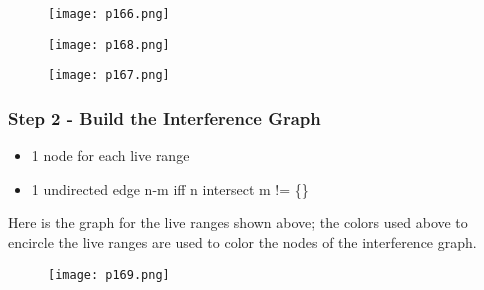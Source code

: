 \begin{figure}[H]
	\centering
	\texttt{[image: p166.png]}
	\caption{}
	\label{fig:p166}
\end{figure}

\begin{figure}[H]
	\centering
	\texttt{[image: p168.png]}
	\caption{}
	\label{fig:p168}
\end{figure}
\begin{figure}[H]
	\centering
	\texttt{[image: p167.png]}
	\caption{}
	\label{fig:p167}
\end{figure}


\subsubsection{Step 2 - Build the Interference Graph}

\begin{itemize}
	\item 1 node for each live range
	\item 1 undirected edge n-m iff n intersect m != \{\}
\end{itemize}	


Here is the graph for the live ranges shown above; the colors used above to encircle the live ranges are used to color the nodes of the interference graph.
\begin{figure}[H]
	\centering
	\texttt{[image: p169.png]}
	\caption{}
	\label{fig:p169}
\end{figure}



